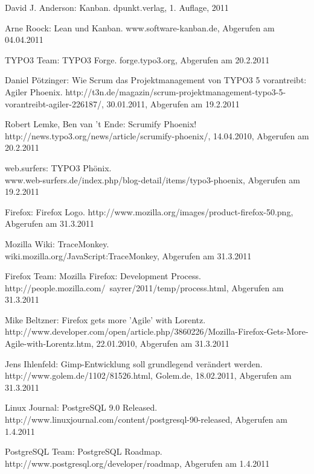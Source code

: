 \documentclass[german,english]{header}
\begin{document}
\begin{thebibliography}{5}
David J. Anderson: 
Kanban.
dpunkt.verlag, 1. Auflage, 2011

Arne Roock: 
Lean und Kanban.
www.software-kanban.de, Abgerufen am 04.04.2011

TYPO3 Team:
TYPO3 Forge.
forge.typo3.org, Abgerufen am 20.2.2011

Daniel Pötzinger:
Wie Scrum das Projektmanagement von TYPO3 5 vorantreibt: Agiler Phoenix.
http://t3n.de/magazin/scrum-projektmanagement-typo3-5-vorantreibt-agiler-226187/, 30.01.2011, Abgerufen am 19.2.2011

Robert Lemke, Ben van 't Ende:
Scrumify Phoenix!\\
http://news.typo3.org/news/article/scrumify-phoenix/, 14.04.2010, Abgerufen am 20.2.2011

web.surfers:
TYPO3 Phönix.\\
www.web-surfers.de/index.php/blog-detail/items/typo3-phoenix, Abgerufen am 19.2.2011

Firefox:
Firefox Logo.
http://www.mozilla.org/images/product-firefox-50.png, Abgerufen am 31.3.2011

Mozilla Wiki:
TraceMonkey.\\
wiki.mozilla.org/JavaScript:TraceMonkey, Abgerufen am 31.3.2011

Firefox Team:
Mozilla Firefox: Development Process.\\
http://people.mozilla.com/~sayrer/2011/temp/process.html, Abgerufen am 31.3.2011

Mike Beltzner:
Firefox gets more 'Agile' with Lorentz.\\
http://www.developer.com/open/article.php/3860226/Mozilla-Firefox-Gets-More-Agile-with-Lorentz.htm, 22.01.2010, Abgerufen am 31.3.2011

Jens Ihlenfeld: Gimp-Entwicklung soll grundlegend verändert werden.\\
http://www.golem.de/1102/81526.html, Golem.de, 18.02.2011, Abgerufen am 31.3.2011

Linux Journal:
PostgreSQL 9.0 Released.\\
http://www.linuxjournal.com/content/postgresql-90-released, Abgerufen am 1.4.2011

PostgreSQL Team:
PostgreSQL Roadmap.\\
http://www.postgresql.org/developer/roadmap, Abgerufen am 1.4.2011


\end{thebibliography}
\end{document}
